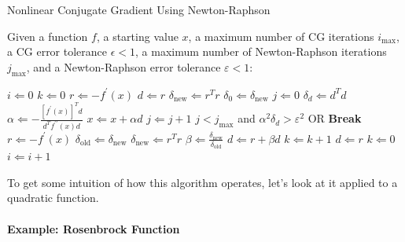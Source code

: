 \begin{algorithm}
	\caption{Nonlinear Conjugate Gradient Using Newton-Raphson \cite[]{Shewchuk1994}\label{CongGradAlg}}
	Given a function $f$, a starting value $x$, a maximum number of CG iterations $i_{\text{max}}$, a CG error tolerance $\epsilon<1$, a maximum number of Newton-Raphson iterations $j_{\text{max}}$, and a Newton-Raphson error tolerance $\varepsilon<1$:
	\begin{algorithmic}
		\State $i\Leftarrow 0$
		\State $k\Leftarrow 0$
		\State $r\Leftarrow -f^{\prime}(x)$
		\State $d\Leftarrow r$
		\State $\delta_{\text{new}}\Leftarrow r^Tr$
		\State $\delta_0\Leftarrow\delta_{\text{new}}$
		\State $j\Leftarrow 0$
		\State $\delta_d\Leftarrow d^Td$
		\State $\alpha\Leftarrow -\frac{\left[f^{\prime}(x)\right]^Td}{d^Tf^{\prime\prime}(x)d}$
		\State $x\Leftarrow x+\alpha d$
		\State $j\Leftarrow j+1$
		\State $j<j_{\text{max}}$ and $\alpha^2\delta_d>\varepsilon^2$ OR \textbf{Break}
		\EndWhile
		\State $r\Leftarrow -f^{\prime}(x)$
		\State $\delta_{\text{old}}\Leftarrow\delta_{\text{new}}$
		\State $\delta_{\text{new}}\Leftarrow r^T r$
		\State $\beta\Leftarrow\frac{\delta_{\text{new}}}{\delta_{\text{old}}}$
		\State $d\Leftarrow r+\beta d$
		\State $k\Leftarrow k+1$
		\State $d\Leftarrow r$
		\State $k\Leftarrow 0$
		\EndIf
		\State $i\Leftarrow i+1$
		\EndWhile
	\end{algorithmic}
\end{algorithm}

To get some intuition of how this algorithm operates, let's look at it applied to a quadratic function.

\paragraph{Example: Rosenbrock Function}
